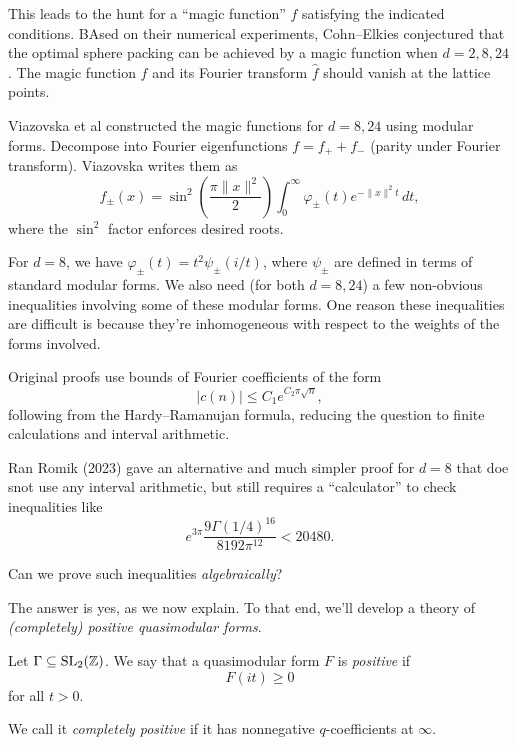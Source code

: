 \documentclass[reqno]{amsart} 
\begin{document}
This leads to the hunt for a ``magic function'' $f$ satisfying the indicated conditions.  BAsed on their numerical experiments, Cohn--Elkies conjectured that the optimal sphere packing can be achieved by a magic function when $d=2,8,24$.  The magic function $f$ and its Fourier transform $\hat{f}$ should vanish at the lattice points.

Viazovska et al constructed the magic functions for $d = 8,24$ using modular forms.  Decompose into Fourier eigenfunctions $f = f_+ + f_-$ (parity under Fourier transform).  Viazovska writes them as
\begin{equation*}
  f_{\pm}(x) = \sin^2 \left( \frac{\pi \lVert x \rVert^2}{2} \right)
  \int_0^\infty \varphi_{\pm}(t) e^{- \lVert x \rVert^2 t} \, d t,
\end{equation*}
where the $\sin^2$ factor enforces desired roots.

For $d = 8$, we have $\varphi_{\pm}(t) = t^2 \psi_{\pm}(i/t) $, where $\psi_{\pm}$ are defined in terms of standard modular forms.  We also need (for both $d = 8, 24$) a few non-obvious inequalities involving some of these modular forms.  One reason these inequalities are difficult is because they're inhomogeneous with respect to the weights of the forms involved.

Original proofs use bounds of Fourier coefficients of the form
\begin{equation*}
  \lvert c(n) \rvert \leq C_1 e^{C_2 \pi \sqrt{n}},
\end{equation*}
following from the Hardy--Ramanujan formula, reducing the question to finite calculations and interval arithmetic.

Ran Romik (2023) gave an alternative and much simpler proof for $d = 8$ that doe snot use any interval arithmetic, but still requires a ``calculator'' to check inequalities like
\begin{equation*}
  e^{3 \pi} \frac{9 \Gamma(1/4)^{16}}{8192 \pi^{12}} < 20480.
\end{equation*}

\begin{question}
  Can we prove such inequalities \emph{algebraically}?
\end{question}
The answer is yes, as we now explain.  To that end, we'll develop a theory of \emph{(completely) positive quasimodular forms}.

\begin{definition}
  Let $\Gamma \subseteq \operatorname{SL}_2(\mathbb{Z})$.  We say that a quasimodular form $F$
  is \emph{positive} if
  \begin{equation*}
    F(i t) \geq 0
  \end{equation*}
  for all $t > 0$.

  We call it \emph{completely positive} if it has nonnegative $q$-coefficients at $\infty$.
\end{definition}
\end{document}
